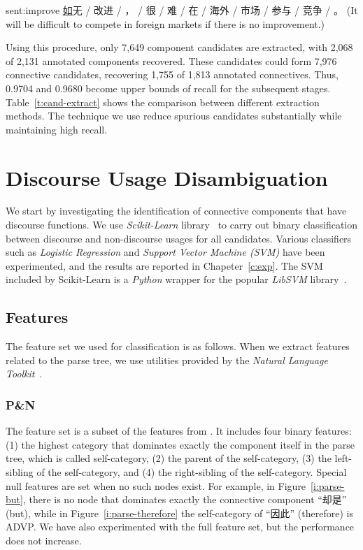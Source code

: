 \begin{sent}{sent:improve}{}
    \underline{如}无 / 改进 / ， / 很 / 难 / 在 / 海外 / 市场 / 参与 / 竞争 /
    。 (It will be difficult to compete in foreign markets if there is no
    improvement.)
\end{sent}

Using this procedure, only 7,649 component candidates are extracted, with 2,068 of 2,131 annotated
components recovered. These candidates could form 7,976 connective candidates, recovering
1,755 of 1,813 annotated connectives. Thus, 0.9704 and 0.9680 become upper bounds of recall
for the subsequent stages. Table~\ref{t:cand-extract} shows the comparison between different
extraction methods. The technique we use reduce spurious candidates substantially while
maintaining high recall.



\section{Discourse Usage Disambiguation}

We start by investigating the identification of connective components that have discourse functions.
We use \textit{Scikit-Learn} library~\citep{scikit-learn} to carry out binary classification between discourse
and non-discourse usages for all candidates. Various classifiers such as \textit{Logistic Regression}
and \textit{Support Vector Machine (SVM)} have been experimented, and the results are
reported in Chapeter~\ref{c:exp}. The SVM included by Scikit-Learn is a \textit{Python} wrapper for the popular
\textit{LibSVM} library~\citep{CC01a}.

\subsection{Features}

The feature set we used for classification is as follows.
When we extract features related to the parse tree, we use utilities provided by the
\textit{Natural Language Toolkit}~\citep{BirdKleinLoper09}.

\subsubsection{P\&N}

The feature set is a subset of the features from
\cite{pitler2009using}. It includes four binary features:
(1) the highest category that dominates exactly the component
itself in the parse tree, which is called self-category, (2) the parent of the self-category,
(3) the left-sibling of the self-category, and (4) the right-sibling of the self-category.
Special null features are set when no such nodes exist. For example,
in Figure~\ref{i:parse-but}, there is no node that dominates exactly the
connective component ``却是'' (but), while in Figure~\ref{i:parse-therefore} the
self-category of ``因此'' (therefore) is ADVP. We have also experimented
with the full feature set, but the performance does not increase.

